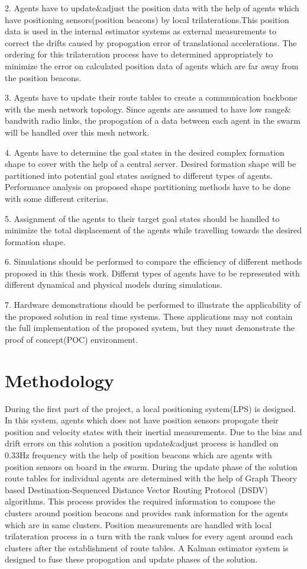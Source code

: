 2. Agents have to update$\&$adjust the position data with the help of agents which have positioning sensors(position beacons) by local trilaterations.This position data is used in the internal estimator systems as external measurements to correct the drifts caused by propogation error of translational accelerations.  The ordering for this trilateration process have to determined appropriately to minimize the error on calculated position data of agents which are far away from the position beacons.

3. Agents have to update their route tables to create a communication backbone with the mesh network topology. Since agents are assumed to have low range$\&$bandwith radio links, the propogation of a data between each agent in the swarm will be handled over this mesh network. 

4. Agents have to determine the goal states in the desired complex formation shape to cover with the help of a central server. Desired formation shape will be partitioned into potential goal states assigned to different types of agents. Performance analysis on proposed shape partitioning methods have to be done with some different criterias. 

5. Assignment of the agents to their target goal states should be handled to minimize the total displacement of the agents while travelling towards the desired formation shape. 

6. Simulations should be performed to compare the efficiency of different methods proposed in this thesis work. Differnt types of agents have to be represented with different dynamical and physical models during simulations.

7. Hardware demonstrations should be performed to illustrate the applicability of the proposed solution in real time systems. These applications may not contain the full implementation of the proposed system, but they must demonstrate the proof of concept(POC) environment.

\section{Methodology}
During the first part of the project, a local positioning system(LPS) is designed. In this system, agents which does not have position sensors propogate their position and velocity states with their inertial measurements. Due to the bias and drift errors on this solution a position update$\&$adjust process is handled on 0.33Hz frequency with the help of position beacons which are agents with position sensors on board in the swarm. During the update phase of the solution route tables for individual agents are determined with the help of Graph Theory based Destination-Sequenced Distance Vector Routing Protocol (DSDV) algorithms. This process provides the required information to compose the clusters around position beacons and provides rank information for the agents which are in same clusters. Position measurements are handled with local trilateration process in a turn with the rank values for every agent around each clusters after the establishment of route tables. A Kalman estimator system is designed to fuse these propogation and update phases of the solution.

